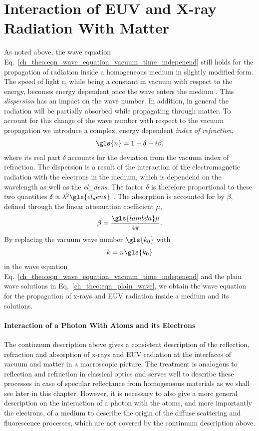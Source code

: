 \section{Interaction of EUV and X-ray Radiation With Matter} \label{ch_theo:sec_interaction}
As noted above, the wave equation Eq.~\eqref{ch_theo:eqn_wave_equation_vacuum_time_indepenend} still holds for the propagation of radiation inside a homogeneous medium in slightly modified form. The speed of light \gls{c}, while being a constant in vacuum with respect to the energy, becomes energy dependent once the wave enters the medium \cite{bergevin_interaction_2009}. This \emph{dispersion} has an impact on the wave number. In addition, in general the radiation will be partially absorbed while propagating through matter. To account for this change of the wave number with respect to the vacuum propagation we introduce a complex, energy dependent \emph{index of refraction},
\begin{align}
\gls{n} = 1 - \delta - i \beta \text{,} \label{ch_theo:eqn_n}
\end{align}
where its real part $\delta$ accounts for the deviation from the vacuum index of refraction. The dispersion is a result of the interaction of the electromagnetic radiation with the electrons in the medium, which is dependend on the wavelength as well as the \emph{\gls{el_dens}}. The factor $\delta$ is therefore proportional to these two quantities $\delta \propto \lambda^2 \gls{el_dens}$ \cite{als-nielsen_x-rays_2011, mikulik_x-ray_1997}. The absorption is accounted for by $\beta$, defined through the linear attenuation coefficient $\mu$,
\begin{align}
\beta = \frac{\gls{lambda} \mu}{4 \pi} \text{.}
\end{align}
By replacing the vacuum wave number $\gls{k_0}$ with 
\begin{align}
k = n \gls{k_0} \label{ch_theo:eqn_k_inside_medium}
\end{align}
in the wave equation Eq.~\eqref{ch_theo:eqn_wave_equation_vacuum_time_indepenend} and the plain wave solutions in Eq.~\eqref{ch_theo:eqn_plain_wave}, we obtain the wave equation for the propagation of x-rays and EUV radiation inside a medium and its solutions.

\paragraph{Interaction of a Photon With Atoms and its Electrons}
The continuum description above gives a consistent description of the reflection, refraction and absorption of x-rays and EUV radiation at the interfaces of vacuum and matter in a macroscopic picture. The treatment is analogous to reflection and refraction in classical optics and serves well to describe these processes in case of specular reflectance from homogeneous materials as we shall see later in this chapter. However, it is necessary to also give a more general description on the interaction of a photon with the atoms, and more importantly the electrons, of a medium to describe the origin of the diffuse scattering and fluorescence processes, which are not covered by the continuum description above.

